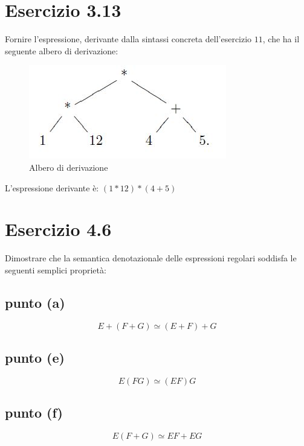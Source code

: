 	\section{Esercizio 3.13}
		Fornire l'espressione, derivante dalla sintassi concreta
		dell'esercizio $11$, che ha il seguente albero di derivazione:
		
		\begin{figure}[h]
			\centering
			\includegraphics[scale=0.5]{img/3-13}
			\caption{Albero di derivazione}
		\end{figure}
		
		\sectionline
		
		L'espressione derivante \`e: $(1*12)*(4+5)$
		
		\newpage
	
	\newpage \section{Esercizio 4.6}
		Dimostrare che la semantica denotazionale delle espressioni regolari
		soddisfa le seguenti semplici propriet\`a:
		\subsection{punto (a)}
			$$E+(F+G) \simeq (E+F)+G$$
		\subsection{punto (e)}
			$$E(FG) \simeq (EF)G$$
		\subsection{punto (f)}
			$$E(F+G) \simeq EF+EG$$
			
		\sectionline
		
